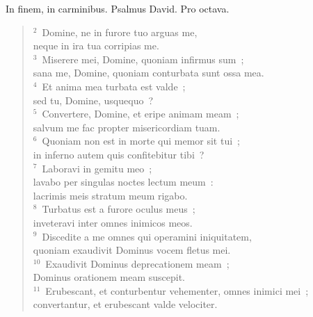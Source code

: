\bchapter
\lettrine[lines=3,image=true,loversize=0.05,lraise=-0.03]{I}{}n finem, in carminibus. Psalmus David. Pro octava.
\begin{flushleft}\begin{verse}\vspace{6pt}${}^{2}$~Domine, ne in furore tuo arguas me,\\ neque in ira tua corripias me.\\
${}^{3}$~Miserere mei, Domine, quoniam infirmus sum~;\\ sana me, Domine, quoniam conturbata sunt ossa mea.\\
${}^{4}$~Et anima mea turbata est valde~;\\ sed tu, Domine, usquequo~?\\
${}^{5}$~Convertere, Domine, et eripe animam meam~;\\ salvum me fac propter misericordiam tuam.\\
${}^{6}$~Quoniam non est in morte qui memor sit tui~;\\ in inferno autem quis confitebitur tibi~?\\
${}^{7}$~Laboravi in gemitu meo~;\\ lavabo per singulas noctes lectum meum~:\\ lacrimis meis stratum meum rigabo.\\
${}^{8}$~Turbatus est a furore oculus meus~;\\ inveteravi inter omnes inimicos meos.\\
${}^{9}$~Discedite a me omnes qui operamini iniquitatem,\\ quoniam exaudivit Dominus vocem fletus mei.\\
${}^{10}$~Exaudivit Dominus deprecationem meam~;\\ Dominus orationem meam suscepit.\\
${}^{11}$~Erubescant, et conturbentur vehementer, omnes inimici mei~;\\ convertantur, et erubescant valde velociter.\end{verse}\end{flushleft}



